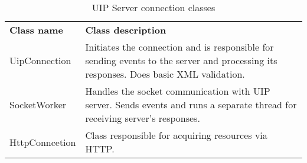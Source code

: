 \begin{table}[htbp]
  \centering
  \caption{UIP Server connection classes}
  \label{tab:uipCommClasses}
 \renewcommand{\arraystretch}{1.2}
    \begin{tabularx}{\textwidth}{p{3cm}|X}
    \rowcolor{mygray}
    \textbf{Class name} & \textbf{Class description} \\
      UipConnection & Initiates the connection and is responsible for sending events to the server and processing its responses. Does basic XML validation. \\ \hline
       SocketWorker & Handles the socket communication with UIP server. Sends events and runs a separate thread for receiving server's responses. \\ \hline
       HttpConncetion & Class responsible for acquiring resources via HTTP.
    \end{tabularx}%
\end{table}%